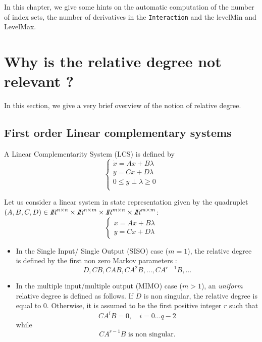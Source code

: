 
In this chapter, we give some hints on the automatic computation of the number of index sets, the number of derivatives in the {\tt Interaction} and the levelMin and LevelMax.


\section{Why is the  relative degree not relevant ?}
In this section, we give a very brief overview of the notion of relative degree.

\subsection{First order Linear complementary systems}

 A  Linear Complementarity System (LCS) is defined by
\begin{equation}
  \label{eq:LCS-bis}
  \begin{cases}
    \dot x = A x +B \lambda \\
     y = C x + D \lambda\\
    0 \leq  y \perp \lambda \geq 0 \\
  \end{cases}
\end{equation} 
 \begin{definition}
      Let us consider a linear system in state representation given by the quadruplet $(A,B,C,D) \in \RR^{n\times n}\times\RR^{n \times m}\times \RR^{m\times n}\times\RR^{m\times m} $:
      \begin{equation}
        \label{eq:LS}
        \begin{cases}
          \dot x = A x +B \lambda \\
          y = C x + D \lambda
        \end{cases}
      \end{equation}
      \begin{itemize}
      \item In the Single Input/ Single Output (SISO) case ($m=1$), the relative
        degree is defined by the first non zero Markov parameters :
        \begin{equation}
          \label{eq:Markov-Parameter}
          D, CB, CAB, CA^2B, \ldots, CA^{r-1}B, \ldots
        \end{equation}
      \item In the multiple input/multiple output (MIMO) case ($m>1$), an \textit{uniform} relative degree is defined as follows.
        If $D$ is non singular, the relative degree is equal to $0$. Otherwise, it is assumed to be the first positive integer $r$ such that 
        \begin{equation}
          \label{eq:mimo-r}
          CA^{i}B =0, \quad i=0\ldots q-2
        \end{equation}
        while
        \begin{equation}
          \label{eq:mimo-r2}
          CA^{r-1}B \text{ is non singular}.
        \end{equation}
      \end{itemize}
    \end{definition}
